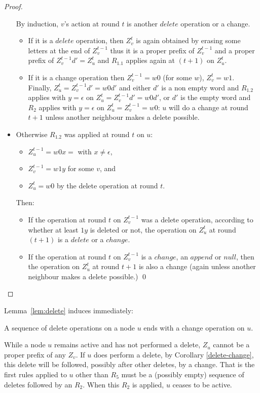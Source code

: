 \documentclass[11pt,envcountsame,letterpaper]{llncs}
\begin{document}
\begin{proof}
\begin{itemize}
By induction, $v$'s action at round $t$ is another $delete$ operation
or a change.
\begin{itemize}
\item If it is a $delete$ operation, 
then $Z_v^{t}$  is again obtained 
by erasing some letters at the end of $Z_v^{t-1}$
thus it is a proper prefix of   $Z_v^{t-1}$ and 
a proper prefix
of $Z_v^{t-1}d'=Z_u^{t}$ and $R_{1.1}$ 
applies again at $(t+1)$ on $Z_u^{t}$.
\item 
If it is a change operation then $Z_v^{t-1}=w0$ (for some $w$), 
$Z_v^{t}=w1.$ Finally, $Z_u^{t}=Z_v^{t-1}d'=w0d'$
and  either $d'$ is a non empty word and $R_{1.2}$ applies with $y=\epsilon$
on $Z_u^{t}=Z_v^{t-1}d'=w0d'$,
or $d'$ is the empty word and
$R_2$ applies with $y=\epsilon$ on $Z_u^{t}=Z_v^{t-1}=w0$: $u$ will do a change at round $t+1$ unless another neighbour makes a delete possible.
\end{itemize}
\item
Otherwise $R_{1.2}$ was applied at round $t$ on $u$: 
\begin{itemize}
\item  $Z_u^{t-1}=w0x=$ with $x\neq \epsilon$,
\item $Z_v^{t-1}=w1y$ for some $v$, and 
\item $Z_u^{t}=w0$ by the delete operation at round $t$.
\end{itemize}
Then:
\begin{itemize}
\item If the operation at round $t$ on $Z_v^{t-1}$ was a delete operation,
according to whether
at least $1y$ is deleted or not, the operation on $Z_u^{t}$ at round 
$(t+1)$ is
a $delete$  or a $change.$
\item If the operation at round $t$ on $Z_v^{t-1}$ is a $change$, an $append$
or $null$, then the operation on $Z_u^{t}$ at round
$t+1$ is also a change (again unless
another neighbour makes a delete possible.)
\qed
\end{itemize}
\end{itemize}
\end{proof}

Lemma~\ref{lem:delete} induces immediately:
\begin{corollary}\label{delete-change}
A sequence of delete operations on a node $u$ ends with a 
change operation on $u$.
\end{corollary}

\begin{remark}\label{rem:active}
While a node $u$ remains active and has
not performed a delete, $Z_u$ cannot be a proper prefix of any $Z_v$.
If $u$ does perform a delete, by Corollary \ref{delete-change}, this delete
will be followed, possibly after other deletes, by a change.
That is the first rules applied to $u$ other than $R_5$ must be a
(possibly empty) sequence of deletes followed by an $R_2$. When this $R_2$ is applied,
$u$ ceases to be active.
\end{remark}
\end{document}
